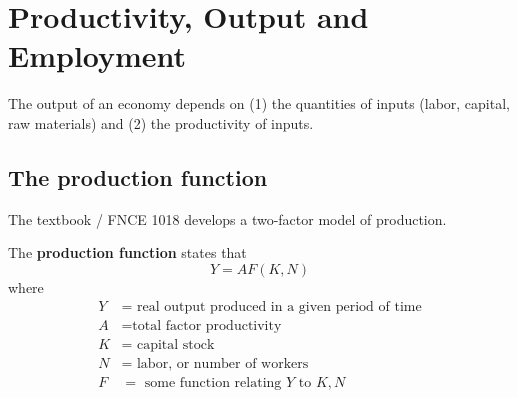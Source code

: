 \section{Productivity, Output and Employment}

The output of an economy depends on (1) the quantities of inputs (labor, capital, raw materials) and (2) the productivity of inputs.

\subsection{The production function}

The textbook / FNCE 1018 develops a two-factor model of production. 

\begin{definition}
    The \textbf{production function} states that 
    \[
        Y = AF(K, N)
    \]
    where
    \begin{align*}
        Y &= \text{ real output produced in a given period of time} \\
        A &= \text{total factor productivity} \\
        K &= \text{ capital stock} \\
        N &= \text{ labor, or number of workers} \\
        F &= \text{ some function relating $Y$ to $K, N$}
    \end{align*}
\end{definition}

